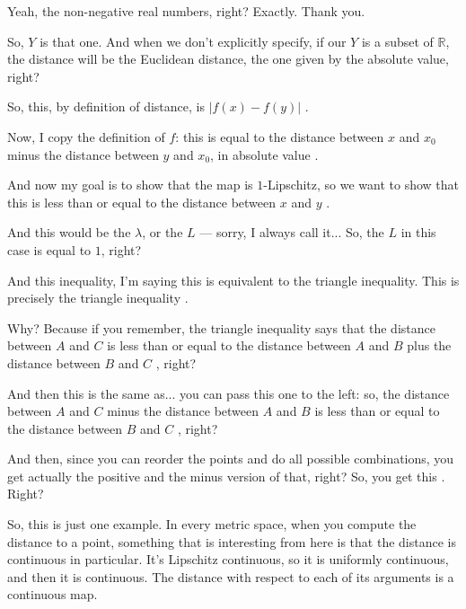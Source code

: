 \begin{speech}[00:14:33 - 00:16:22]
Yeah, the non-negative real numbers, right? \inlinemetanote{writes $Y = [0, \infty)$ on the board} Exactly. Thank you. 

So, $Y$ is that one. And when we don't explicitly specify, if our $Y$ is a subset of $\mathbb{R}$, the distance will be the Euclidean distance, the one given by the absolute value, right?

So, this, by definition of distance, is $|f(x) - f(y)|$ .

Now, I copy the definition of $f$: this is equal to the distance between $x$ and $x_0$ minus the distance between $y$ and $x_0$, in absolute value .

And now my goal is to show that the map is $1$-Lipschitz, so we want to show that this is less than or equal to the distance between $x$ and $y$ .

And this would be the $\lambda$, or the $L$ --- sorry, I always call it... So, the $L$ in this case is equal to $1$, right? 
\end{speech}

\begin{speech}[00:16:22 - 00:18:22]
And this inequality, I'm saying this is equivalent to the triangle inequality. This is precisely the triangle inequality .

Why? Because if you remember, the triangle inequality says that the distance between $A$ and $C$ is less than or equal to the distance between $A$ and $B$ plus the distance between $B$ and $C$ , right?

And then this is the same as... you can pass this one to the left: so, the distance between $A$ and $C$ minus the distance between $A$ and $B$ is less than or equal to the distance between $B$ and $C$ , right?

And then, since you can reorder the points and do all possible combinations, you get actually the positive and the minus version of that, right? So, you get this . Right?

So, this is just one example. In every metric space, when you compute the distance to a point, something that is interesting from here is that the distance is continuous in particular. It's Lipschitz continuous, so it is uniformly continuous, and then it is continuous. The distance with respect to each of its arguments is a continuous map.
\end{speech}

